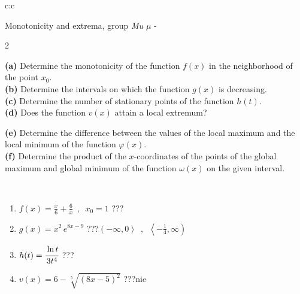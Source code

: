 \documentclass[10pt]{report}
\begin{document}
\begin{tabular}{c:c}
\begin{minipage}[c][104.5mm][t]{0.5\linewidth}
\begin{center}
\vspace{5mm}
{\huge Monotonicity and extrema, group \textit{Mu $\mu$} -}\\[5mm]
\begin{minipage}{0.95\linewidth}
\begin{center}
{\small \begin{multicols}{2} \raggedright
\textbf{(a)} Determine the monotonicity of the function \(f(x)\) in the neighborhood of the point \(x_0\). \\[1mm]
\textbf{(b)} Determine the intervals on which the function \(g(x)\) is decreasing. \\[1mm]
\textbf{(c)} Determine the number of stationary points of the function \(h(t)\). \\[1mm]
\textbf{(d)} Does the function \(v(x)\) attain a local extremum? \par \columnbreak
\textbf{(e)} Determine the difference between the values of the local maximum and the local minimum of the function \(\varphi(x)\). \\[1mm]
\textbf{(f)} Determine the product of the \(x\)-coordinates of the points of the global maximum and global minimum of the function \(\omega(x)\) on the given interval. \\[1mm]
\end{multicols}
}
\end{center}
\end{minipage}
\\[1mm]
\begin{minipage}{0.79\linewidth}
\begin{center}
\begin{varwidth}{\linewidth}
\setlength{\itemsep}{0pt}
\begin{enumerate}
\normalsize
\item $f(x)=\frac{x}{6}+\frac{6}{x} \enspace , \enspace x_0=1$\quad \dotfill\; ???\;\dotfill \quad {}
\item $g(x)=x^2\, e^{8x-9}$\quad \dotfill\; ???\;\dotfill \quad $\left(-\infty , 0\right\rangle\enspace , \enspace \left\langle-\frac{1}{4} , \infty\right)$
\item $h(t)=\cfrac{\ln t}{3t^4}$\quad \dotfill\; ???\;\dotfill {}
\item $v(x)=6-\sqrt[5]{(8x-5)^2}$\quad \dotfill\; ???\;\dotfill \quad $\text{nie}$

\end{enumerate}
\end{varwidth}
\end{center}
\end{minipage}
\end{center}
\end{minipage}
\end{tabular}
\end{document}
